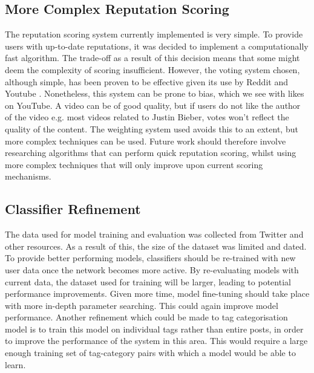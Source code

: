 \subsection{More Complex Reputation Scoring}
The reputation scoring system currently implemented is very simple. To provide users with up-to-date reputations, it was decided to implement a computationally fast algorithm. The trade-off as a result of this decision means that some might deem the complexity of scoring insufficient. However, the voting system chosen, although simple, has been proven to be effective given its use by Reddit and Youtube \cite{Reddit:About, Youtube:Home}. Nonetheless, this system can be prone to bias, which we see with likes on YouTube. A video can be of good quality, but if users do not like the author of the video e.g. most videos related to Justin Bieber, votes won't reflect the quality of the content. The weighting system used avoids this to an extent, but more complex techniques can be used. Future work should therefore involve researching algorithms that can perform quick reputation scoring, whilst using more complex techniques that will only improve upon current scoring mechanisms.

\subsection{Classifier Refinement}
The data used for model training and evaluation was collected from Twitter and other resources. As a result of this, the size of the dataset was limited and dated. To provide better performing models, classifiers should be re-trained with new user data once the network becomes more active. By re-evaluating models with current data, the dataset used for training will be larger, leading to potential performance improvements. Given more time, model fine-tuning should take place with more in-depth parameter searching. This could again improve model performance. Another refinement which could be made to tag categorisation model is to train this model on individual tags rather than entire posts, in order to improve the performance of the system in this area. This would require a large enough training set of tag-category pairs with which a model would be able to learn.

